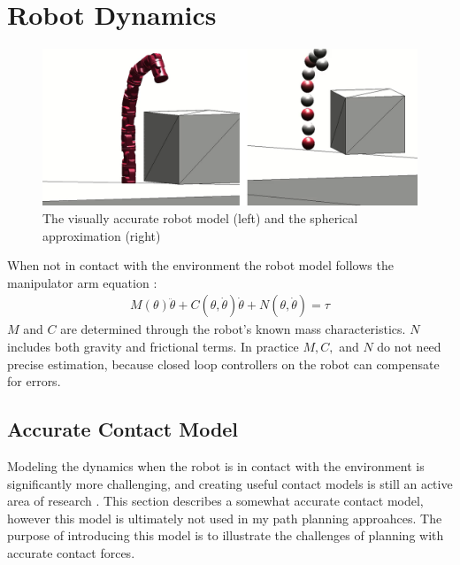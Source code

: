 \documentclass[../thesis.tex]{subfiles}
\begin{document}
\section{Robot Dynamics} \label{sec:robot_dynamics}

\begin{figure}
  \centering
  \includegraphics[width=.7\linewidth]{./Planning/sphere_approxmation.png}
  \caption{The visually accurate robot model (left) and the spherical approximation (right)}
  \label{fig:sphere_approximation}
\end{figure}


When not in contact with the environment the robot model follows the manipulator arm equation \cite{murray1994mathematical}:
\begin{align}
  M(\theta)\ddot \theta + C(\theta, \dot\theta)\dot\theta + N(\theta, \dot\theta) = \tau \label{eq:manipulator}
\end{align}
$M$ and $C$ are determined through the robot's known mass characteristics.
$N$ includes both gravity and frictional terms.
In practice $M, C,$ and $N$ do not need precise estimation, because closed loop controllers on the robot can compensate for errors.

\subsection{Accurate Contact Model}

Modeling the dynamics when the robot is in contact with the environment is significantly more challenging, and creating useful contact models is still an active area of research \cite{Posa2013}\cite{del2012control}\cite{Tonneau}.
This section describes a somewhat accurate contact model, however this model is ultimately not used in my path planning approahces.
The purpose of introducing this model is to illustrate the challenges of planning with accurate contact forces.
\end{document}
